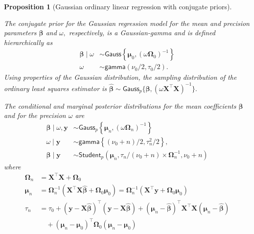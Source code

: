 \documentclass[
  11pt,
  letterpaper,
]{scrbook}
\theoremstyle{plain}
\newtheorem{proposition}{Proposition}[chapter]
\theoremstyle{definition}
\theoremstyle{definition}
\theoremstyle{plain}
\theoremstyle{plain}
\theoremstyle{definition}
\theoremstyle{remark}
\begin{document}
\begin{proposition}[Gaussian ordinary linear regression with conjugate
priors]\protect\hypertarget{prp-gaussian-ols}{}\label{prp-gaussian-ols}

The conjugate prior for the Gaussian regression model for the mean and
precision parameters \(\boldsymbol{\beta}\) and \(\omega,\)
respectively, is a Gaussian-gamma and is defined hierarchically as
\begin{align*}
\boldsymbol{\beta} \mid \omega &\sim \mathsf{Gauss}\left\{\boldsymbol{\mu}_0, (
\omega\boldsymbol{\Omega}_0)^{-1}\right\} \\
\omega &\sim \mathsf{gamma}(\nu_0/2,\tau_0/2).
\end{align*} Using properties of the Gaussian distribution, the sampling
distribution of the ordinary least squares estimator is
\(\widehat{\boldsymbol{\beta}} \sim \mathsf{Gauss}_p\{\boldsymbol{\beta}, (\omega\mathbf{X}^\top\mathbf{X})^{-1}\}.\)

The conditional and marginal posterior distributions for the mean
coefficients \(\boldsymbol{\beta}\) and for the precision \(\omega\) are
\begin{align*}
\boldsymbol{\beta} \mid \omega, \boldsymbol{y} &\sim \mathsf{Gauss}_p\left\{\boldsymbol{\mu}_n, (\omega\boldsymbol{\Omega}_n)^{-1}\right\}  \\
\omega \mid  \boldsymbol{y} &\sim \mathsf{gamma}\left\{(\nu_0 + n)/2,  \tau^2_n/2\right\}, \\
\boldsymbol{\beta} \mid  \boldsymbol{y} &\sim \mathsf{Student}_p(\boldsymbol{\mu}_n,  \tau_n/(\nu_0+n) \times \mathbf{\Omega}_n^{-1}, \nu_0 + n)
\end{align*} where \begin{align*}
\boldsymbol{\Omega}_n &= \mathbf{X}^\top\mathbf{X} + \boldsymbol{\Omega}_0\\
\boldsymbol{\mu}_n &= \boldsymbol{\Omega}_n^{-1}(\mathbf{X}^\top\mathbf{X}\widehat{\boldsymbol{\beta}} + \boldsymbol{\Omega}_0\boldsymbol{\mu}_0) = \boldsymbol{\Omega}_n^{-1}(\mathbf{X}^\top\boldsymbol{y} + \boldsymbol{\Omega}_0\boldsymbol{\mu}_0)\\
\tau_n &= \tau_0 + (\boldsymbol{y} - \mathbf{X}\widehat{\boldsymbol{\beta}})^\top(\boldsymbol{y} - \mathbf{X}\widehat{\boldsymbol{\beta}}) + (\boldsymbol{\mu}_n - \widehat{\boldsymbol{\beta}})^\top \mathbf{X}^\top\mathbf{X}(\boldsymbol{\mu}_n - \widehat{\boldsymbol{\beta}}) \\& \quad + (\boldsymbol{\mu}_n-\boldsymbol{\mu}_0)^\top\boldsymbol{\Omega}_0(\boldsymbol{\mu}_n-\boldsymbol{\mu}_0)
\end{align*}

\end{proposition}
\end{document}
